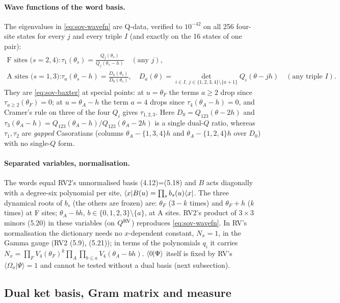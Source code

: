 \paragraph{Wave functions of the word basis.} The eigenvalues in \eqref{eq:sov-wavefn} are Q-data, verified to $10^{-42}$ on all 256 four-site states for every $j$ and every triple $I$
(and exactly on the 16 states of one pair):
\begin{align}
 \text{F sites ($s=2,4$):}\quad&\tau_1(\theta_s)=\frac{Q_j(\theta_s)}{Q_j(\theta_s-h)}\quad(\text{any }j),\label{eq:sov-dictF}\\
 \text{A sites ($s=1,3$):}\quad&\tau_a(\theta_s-h)=\frac{D_a(\theta_s)}{D_0(\theta_s)},\quad
 D_a(\theta)=\det_{i\in I,\ j\in\{1,2,3,4\}\setminus\{a+1\}}Q_i(\theta-jh)\quad(\text{any triple }I).\label{eq:sov-dictA}
\end{align}
They are \eqref{eq:sov-baxter} at special points: at $u=\theta_F$ the terms $a\ge2$ drop since $\tau_{a\ge2}(\theta_F)=0$; at $u=\theta_A-h$ the term $a=4$ drops since
$\tau_4(\theta_A-h)=0$, and Cramer's rule on three of the four $Q_i$ gives $\tau_{1,2,3}$. Here $D_0=Q_{123}(\theta-2h)$ and
$\tau_3(\theta_A-h)=Q_{123}(\theta_A-h)/Q_{123}(\theta_A-2h)$ is a single dual-$Q$ ratio, whereas $\tau_1,\tau_2$ are \emph{gapped} Casoratians (columns
$\theta_A-\{1,3,4\}h$ and $\theta_A-\{1,2,4\}h$ over $D_0$) with no single-$Q$ form.

\paragraph{Separated variables, normalisation.} The words equal RV2's unnormalised basis (4.12)=(5.18) and
$B$ acts diagonally with a degree-six polynomial per site, $\langle x|B(u)=\prod_sb_s(u)\langle x|$. The three dynamical roots of $b_s$ (the others are frozen) are: $\theta_F$ ($3-k$ times) and $\theta_F+h$ ($k$ times) at F sites;
$\theta_A-bh$, $b\in\{0,1,2,3\}\setminus\{a\}$, at A sites. RV2's product of $3\times3$ minors (5.20) in these variables (on $Q^{\rm RV}$) reproduces
\eqref{eq:sov-wavefn}. In RV's normalisation the dictionary needs no $x$-dependent constant, $N_x=1$, in the Gamma gauge (RV2 (5.9), (5.21)); in terms of the polynomials $q_i$ it carries
$N_x=\prod_{F}V_4(\theta_F)^{k}\prod_A\prod_{b\le a}V_4(\theta_A-bh)$. $\langle0|\Psi\rangle$ itself is fixed by RV's $\langle\Omega_\sigma|\Psi\rangle=1$ and cannot be tested without a dual basis (next subsection).

\subsection{Dual ket basis, Gram matrix and measure}\label{sec:sov-dual}

